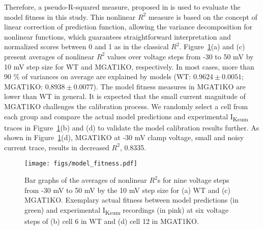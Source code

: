 \documentclass[11pt]{article}
\begin{document}
Therefore, a pseudo-R-squared measure, proposed in \cite{li2019prediction} is used to evaluate the model fitness in this study. This nonlinear $R^{2}$ measure is based on the concept of linear correction of prediction function, allowing the variance decomposition for nonlinear functions, which guarantees straightforward interpretation and normalized scores between 0 and 1 as in the classical $R^{2}$. Figure~\ref{fig:model_fitness}(a) and (c) present averages of nonlinear $R^{2}$ values over voltage steps from -30 to 50 mV by 10 mV step size for WT and MGAT1KO, respectively. In most cases, more than 90 \% of variances on average are explained by models (WT: $0.9624 \pm 0.0051$; MGAT1KO: $0.8938 \pm 0.0077$). The model fitness measures in MGAT1KO are lower than WT in general. It is expected that the small current magnitude of MGAT1KO challenges the calibration process. We randomly select a cell from each group and compare the actual model predictions and experimental I\textsubscript{Ksum} traces in Figure~\ref{fig:model_fitness}(b) and (d) to validate the model calibration results further. As shown in Figure~\ref{fig:model_fitness}(d), MGAT1KO at -30 mV clamp voltage, small and noisy current trace, results in decreased $R^{2}$, 0.8335. 
\begin{figure}[!ht]
    \centering
    \texttt{[image: figs/model\_fitness.pdf]}
    \caption{Bar graphs of the averages of nonlinear $R^{2}$s for nine voltage steps from -30 mV to 50 mV by the 10 mV step size for (a) WT and (c) MGAT1KO. Exemplary actual fitness between model predictions (in green) and experimental I\textsubscript{Ksum} recordings (in pink) at six voltage steps of (b) cell 6 in WT and (d) cell 12 in MGAT1KO.}
    \label{fig:model_fitness}
\end{figure}
\end{document}
